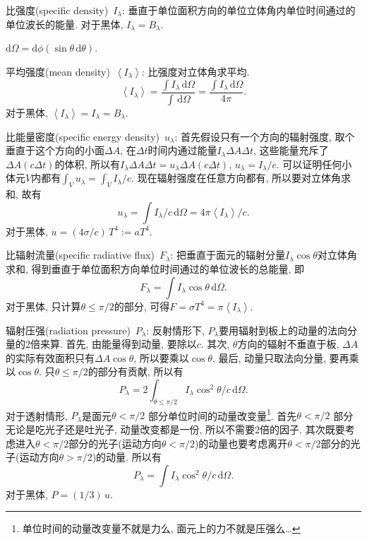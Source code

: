 比强度(specific density)~$I_\lambda$: 垂直于单位面积方向的单位立体角内单位时间通过的单位波长的能量. 对于黑体, $I_\lambda=B_\lambda$.

$\mathrm{d}\Omega=\mathrm{d}\phi(\sin\theta\,\mathrm{d}\theta)$.

平均强度(mean density)~$\left\langle I_\lambda\right\rangle $: 比强度对立体角求平均.
\begin{equation*}
    \left\langle I_\lambda\right\rangle = \frac{\int I_\lambda \,\mathrm{d}\Omega}{\int \,\mathrm{d}\Omega}=\frac{\int I_\lambda \,\mathrm{d}\Omega}{4\pi}.
\end{equation*}
对于黑体, $\left\langle I_\lambda\right\rangle=I_\lambda=B_\lambda$.

比能量密度(specific energy density)~$u_\lambda$: 首先假设只有一个方向的辐射强度, 取个垂直于这个方向的小面$\Delta A$, 在$\Delta t$时间内通过能量$I_\lambda \Delta A \Delta t$, 这些能量充斥了$\Delta A (c \Delta t)$的体积, 所以有$I_\lambda \Delta A \Delta t = u_\lambda \Delta A (c \Delta t)$, $u_\lambda = I_\lambda/c$. 可以证明任何小体元$V$内都有$\int_V u_\lambda = \int_V I_\lambda/c$. 现在辐射强度在任意方向都有, 所以要对立体角求和, 故有
\begin{equation*}
    u_\lambda = \int I_\lambda/c\,\mathrm{d}\Omega = 4\pi\left\langle I_\lambda\right\rangle/c.
\end{equation*}
对于黑体, $u=(4\sigma/c)\,T^4:=aT^4$.

比辐射流量(specific radiative flux)~$F_\lambda$: 把垂直于面元的辐射分量$I_\lambda\cos\theta$对立体角求和, 得到垂直于单位面积方向单位时间通过的单位波长的总能量, 即
\begin{equation*}
    F_\lambda = \int I_\lambda \cos\theta \,\mathrm{d}\Omega.
\end{equation*}
对于黑体, 只计算$\theta\le\pi/2$的部分, 可得$F=\sigma T^4=\pi \left\langle I_\lambda\right\rangle$.

辐射压强(radiation pressure)~$P_\lambda$: 反射情形下, $P_\lambda$要用辐射到板上的动量的法向分量的2倍来算. 首先, 由能量得到动量, 要除以$c$. 其次, $\theta$方向的辐射不垂直于板, $\Delta A$的实际有效面积只有$\Delta A \cos\theta$, 所以要乘以$\cos\theta$. 最后, 动量只取法向分量, 要再乘以$\cos\theta$. 只$\theta\le\pi/2$的部分有贡献, 所以有
\begin{equation*}
    P_\lambda = 2\int_{\theta\le\pi/2} I_\lambda\cos^2\theta/c \,\mathrm{d}\Omega.
\end{equation*}
对于透射情形, $P_\lambda$是面元$\theta<\pi/2$ 部分单位时间的动量改变量\footnote{单位时间的动量改变量不就是力么, 面元上的力不就是压强么\dots}. 首先$\theta<\pi/2$ 部分无论是吃光子还是吐光子, 动量改变都是一份, 所以不需要2倍的因子. 其次既要考虑进入$\theta<\pi/2$部分的光子(运动方向$\theta<\pi/2$)的动量也要考虑离开$\theta<\pi/2$部分的光子(运动方向$\theta>\pi/2$)的动量. 所以有
\begin{equation*}
    P_\lambda = \int I_\lambda\cos^2\theta/c \,\mathrm{d}\Omega.
\end{equation*}
对于黑体, $P=(1/3)\,u$.

